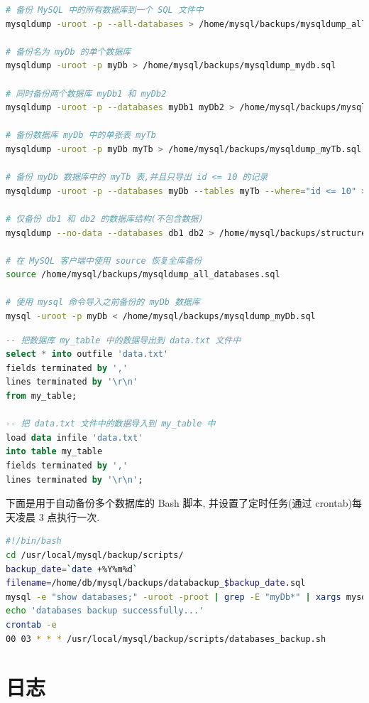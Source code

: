 \begin{lstlisting}[language=bash]
# 备份 MySQL 中的所有数据库到一个 SQL 文件中
mysqldump -uroot -p --all-databases > /home/mysql/backups/mysqldump_all_databases.sql

# 备份名为 myDb 的单个数据库
mysqldump -uroot -p myDb > /home/mysql/backups/mysqldump_mydb.sql

# 同时备份两个数据库 myDb1 和 myDb2
mysqldump -uroot -p --databases myDb1 myDb2 > /home/mysql/backups/mysqldump_databases_mydb12.sql

# 备份数据库 myDb 中的单张表 myTb
mysqldump -uroot -p myDb myTb > /home/mysql/backups/mysqldump_myTb.sql

# 备份 myDb 数据库中的 myTb 表,并且只导出 id <= 10 的记录
mysqldump -uroot -p --databases myDb --tables myTb --where="id <= 10" > /home/mysql/backups/mysqldump_myTb10.sql

# 仅备份 db1 和 db2 的数据库结构(不包含数据)
mysqldump --no-data --databases db1 db2 > /home/mysql/backups/structure.sql

# 在 MySQL 客户端中使用 source 恢复全库备份
source /home/mysql/backups/mysqldump_all_databases.sql

# 使用 mysql 命令导入之前备份的 myDb 数据库
mysql -uroot -p myDb < /home/mysql/backups/mysqldump_myDb.sql
\end{lstlisting}

\begin{lstlisting}[language=sql]
-- 把数据库 my_table 中的数据导出到 data.txt 文件中
select * into outfile 'data.txt'
fields terminated by ','
lines terminated by '\r\n'
from my_table;

-- 把 data.txt 文件中的数据导入到 my_table 中
load data infile 'data.txt'
into table my_table
fields terminated by ','
lines terminated by '\r\n';
\end{lstlisting}

下面是用于自动备份多个数据库的 Bash 脚本, 并设置了定时任务(通过 crontab)每天凌晨 3 点执行一次.
\begin{lstlisting}[language=bash]
#!/bin/bash
cd /usr/local/mysql/backup/scripts/
backup_date=`date +%Y%m%d`
filename=/home/db/mysql/backups/databackup_$backup_date.sql
mysql -e "show databases;" -uroot -proot | grep -E "myDb*" | xargs mysqldump -uroot -proot --databases > $filename
echo 'databases backup successfully...'
crontab -e
00 03 * * * /usr/local/mysql/backup/scripts/databases_backup.sh
\end{lstlisting}

\section{日志}

